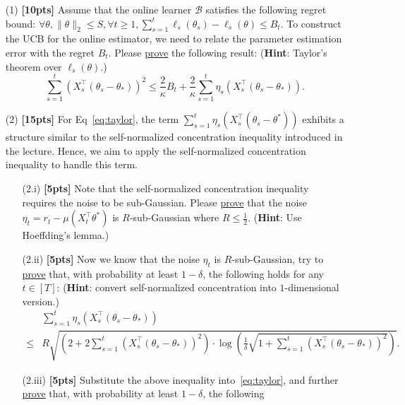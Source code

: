 \documentclass[a4paper]{article}
\numberwithin{equation}{section}
\theoremstyle{definition}
\theoremstyle{definition}
\begin{document}
\begin{enumerate}
  \item[(1)] \textbf{[10pts]} Assume that the online learner $\mathcal{B}$ satisfies the following regret bound: 
  $\forall \theta, \|\theta\|_2 \leq S, \forall t \geq 1, \sum_{s=1}^t \ell_s(\theta_s) - \ell_s(\theta) \leq B_t$. To construct the UCB for the online estimator, we need to relate the parameter estimation error with the regret $B_t$. Please \underline{prove} the following result: (\textbf{Hint}: Taylor's theorem over $\ell_s(\theta)$.)
  \begin{equation}\label{eq:taylor}
    \sum_{s=1}^t\left(X_s^{\top}\left(\theta_s-\theta_*\right)\right)^2 \leq \frac{2}{\kappa} B_t+\frac{2}{\kappa} \sum_{s=1}^t \eta_s\left(X_s^{\top}\left(\theta_s-\theta_*\right)\right).
  \end{equation}
  \item[(2)] \textbf{[15pts]} For Eq~\eqref{eq:taylor}, the term $\sum_{s=1}^t \eta_s\left(X_s^{\top}\left(\theta_s-\theta^*\right)\right)$ exhibits a structure similar to the self-normalized concentration inequality introduced in the lecture. Hence, we aim to apply the self-normalized concentration inequality to handle this term.
  \begin{enumerate}
    \item[(2.i)] \textbf{[5pts]} Note that the self-normalized concentration inequality requires the noise to be sub-Gaussian. Please \underline{prove} that the noise $\eta_t = r_t - \mu(X_t^\top \theta^*)$ is $R$-sub-Gaussian where $R \leq \frac{1}{2}$. (\textbf{Hint}: Use Hoeffding's lemma.)
    \item[(2.ii)]\textbf{[5pts]}  Now we know that the noise $\eta_t$ is $R$-sub-Gaussian, try to \underline{prove} that, with probability at least $1-\delta$, the following 
    holds for any $t \in [T]$: (\textbf{Hint}: convert self-normalized concentration into $1$-dimensional version.)
    \begin{equation*}
    \begin{split}
      {}& \sum_{s=1}^t \eta_s\left(X_s^{\top}\left(\theta_s-\theta_*\right)\right) \\
      \leq {}& R \sqrt{\left(2+2 \sum_{s=1}^t\left(X_s^{\top}\left(\theta_s-\theta_*\right)\right)^2\right) \cdot \log \left(\frac{1}{\delta} \sqrt{1+\sum_{s=1}^t\left(X_s^{\top}\left(\theta_s-\theta_*\right)\right)^2}\right)}.
    \end{split}
    \end{equation*}
    \item[(2.iii)] \textbf{[5pts]} Substitute the above inequality into~\eqref{eq:taylor}, and further \underline{prove} that, with probability at least $1-\delta$, the following 

\end{enumerate}
\end{enumerate}
\end{document}
